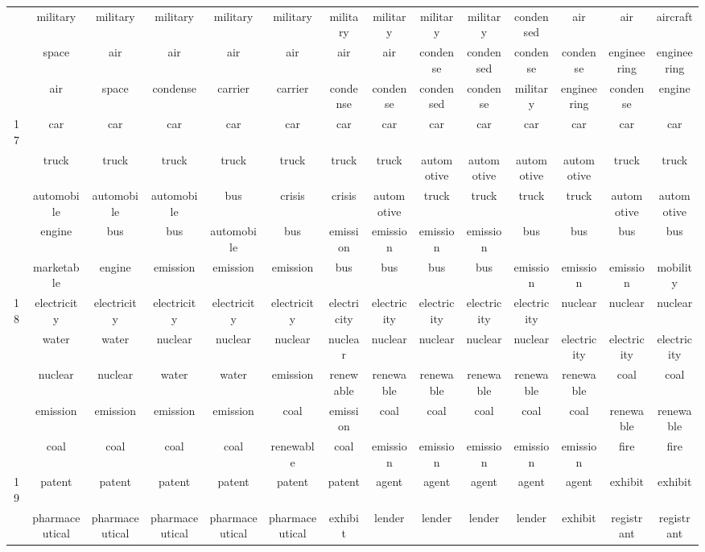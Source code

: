\documentclass[12pt,journal,letterpaper,oneside,onecolumn]{IEEEtran}
\begin{document}
\begin{center}
{\begin{tabular}{c|c|c|c|c|c|c|c|c|c|c|c|c|c}
         & military & military & military & military & military & military & military & military & military & condensed & air & air & aircraft \\ 
         & space & air & air & air & air & air & air & condense & condensed & condense & condense & engineering & engineering \\ 
         & air & space & condense & carrier & carrier & condense & condense & condensed & condense & military & engineering & condense & engine \\ 
        \hline
        17 & car & car & car & car & car & car & car & car & car & car & car & car & car \\ 
         & truck & truck & truck & truck & truck & truck & truck & automotive & automotive & automotive & automotive & truck & truck \\ 
         & automobile & automobile & automobile & bus & crisis & crisis & automotive & truck & truck & truck & truck & automotive & automotive \\ 
         & engine & bus & bus & automobile & bus & emission & emission & emission & emission & bus & bus & bus & bus \\ 
         & marketable & engine & emission & emission & emission & bus & bus & bus & bus & emission & emission & emission & mobility \\ 
        \hline
        18 & electricity & electricity & electricity & electricity & electricity & electricity & electricity & electricity & electricity & electricity & nuclear & nuclear & nuclear \\ 
         & water & water & nuclear & nuclear & nuclear & nuclear & nuclear & nuclear & nuclear & nuclear & electricity & electricity & electricity \\ 
         & nuclear & nuclear & water & water & emission & renewable & renewable & renewable & renewable & renewable & renewable & coal & coal \\ 
         & emission & emission & emission & emission & coal & emission & coal & coal & coal & coal & coal & renewable & renewable \\ 
         & coal & coal & coal & coal & renewable & coal & emission & emission & emission & emission & emission & fire & fire \\ 
        \hline
        19 & patent & patent & patent & patent & patent & patent & agent & agent & agent & agent & agent & exhibit & exhibit \\ 
         & pharmaceutical & pharmaceutical & pharmaceutical & pharmaceutical & pharmaceutical & exhibit & lender & lender & lender & lender & exhibit & registrant & registrant \\ 

\end{tabular}}
\end{center}
\end{document}
